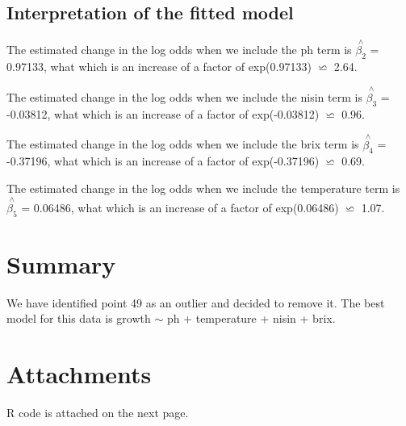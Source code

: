 \documentclass{article}
\begin{document}
\subsection{Interpretation of the fitted model}

The estimated change in the log odds when we include the ph term is $\overset{\wedge}{\beta_2} $ = 0.97133, what which is an increase of a factor of exp(0.97133) $\backsimeq $ 2.64.

The estimated change in the log odds when we include the nisin term is $\overset{\wedge}{\beta_3} $ = -0.03812, what which is an increase of a factor of exp(-0.03812) $\backsimeq $ 0.96.

The estimated change in the log odds when we include the brix term is $\overset{\wedge}{\beta_4} $ = -0.37196, what which is an increase of a factor of exp(-0.37196) $\backsimeq $ 0.69.

The estimated change in the log odds when we include the temperature term is $\overset{\wedge}{\beta_5} $ = 0.06486, what which is an increase of a factor of exp(0.06486) $\backsimeq $ 1.07.

\section{Summary}
We have identified point 49 as an outlier and decided to remove it. The best model for this data is growth $\sim$ ph + temperature + nisin + brix. 
\section{Attachments}
R code is attached on the next page. 
\end{document}
